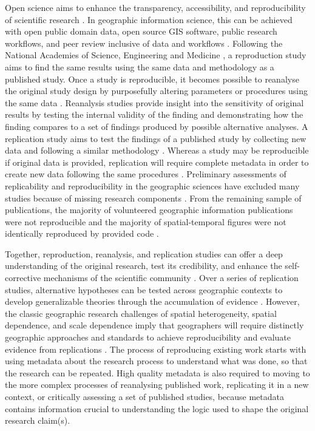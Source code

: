 \documentclass{isprs} %
\begin{document}
Open science aims to enhance the transparency, accessibility, and reproducibility of scientific research \citep{NASEM2018}.
In geographic information science, this can be achieved with open public domain data, open source GIS software, public research workflows, and peer review inclusive of data and workflows \citep{Singleton2016}. 
Following the National Academies of Science, Engineering and Medicine \citep{NASEM2019}, a reproduction study aims to find the same results using the same data and methodology as a published study.
Once a study is reproducible, it becomes possible to reanalyse the original study design by purposefully altering parameters or procedures using the same data \citep{Christensen2019}. 
Reanalysis studies provide insight into the sensitivity of original results by testing the internal validity of the finding and  demonstrating how the finding compares to a set of findings produced by possible alternative analyses. 
A replication study aims to test the findings of a published study by collecting new data and following a similar methodology \citep{NASEM2019}.
Whereas a study may be reproducible if original data is provided, replication will require complete metadata in order to create new data following the same procedures \citep{Ostermann2017}.
Preliminary assessments of replicability and reproducibility in the geographic sciences have excluded many studies because of missing research components \citep{Ostermann2017,Konkol2019}.
From the remaining sample of publications, the majority of volunteered geographic information publications were not reproducible \citep{Ostermann2017} and the majority of spatial-temporal figures were not identically reproduced by provided code \citep{Konkol2019}.

Together, reproduction, reanalysis, and replication studies can offer a deep understanding of the original research, test its credibility, and enhance the self-corrective mechanisms of the scientific community \citep{Christensen2019,NASEM2019}.
Over a series of replication studies, alternative hypotheses can be tested across geographic contexts to develop generalizable theories through the accumulation of evidence \citep{Kedron2022}.
However, the classic geographic research challenges of spatial heterogeneity, spatial dependence, and scale dependence imply that geographers will require distinctly geographic approaches and standards to achieve reproducibility \citep{Kedron2021,Brunsdon2020} and evaluate evidence from replications \citep{Kedron2022}.
The process of reproducing existing work starts with using metadata about the research process to understand what was done, so that the research can be repeated. 
High quality metadata is also required to moving to the more complex processes of reanalysing published work, replicating it in a new context, or critically assessing a set of published studies, because metadata contains information crucial to understanding the logic used to shape the original research claim(s).
\end{document}
